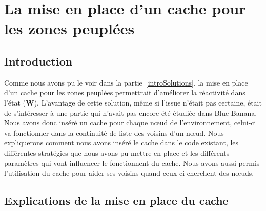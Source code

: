 \section{La mise en place d'un cache pour les zones peuplées}
\subsection{Introduction}
Comme nous avons pu le voir dans la partie~\ref{introSolutions}, la mise en place d'un cache pour les zones peuplées permettrait d'améliorer la réactivité dans l'état (\textbf{W}). L'avantage de cette solution, même si l'issue n'était pas certaine, était de s'intéresser à une partie qui n'avait pas encore été étudiée dans Blue Banana. Nous avons donc inséré un cache pour chaque nœud de l'environnement, celui-ci va fonctionner dans la continuité de liste des voisins d'un nœud. Nous expliquerons comment nous avons inséré le cache dans le code existant, les différentes stratégies que nous avons pu mettre en place et les différents paramètres qui vont influencer le fonctionnent du cache. Nous avons aussi permis l'utilisation du cache pour aider ses voisins quand ceux-ci cherchent des nœuds.
 
\subsection{Explications de la mise en place du cache}

